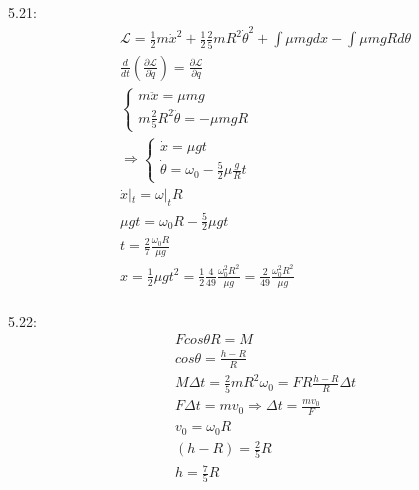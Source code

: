 \documentclass{article}
\begin{document}
5.21:
\begin{align*}
&\mathcal L=\frac12m\dot x^2+\frac12\frac25mR^2 \dot{\theta}^2 +\int \mu mgdx-\int \mu mgR d\theta \\
&\frac{d}{dt}(\frac{ \partial \mathcal L}{ \partial \dot{q}})=\frac{ \partial \mathcal L}{ \partial q} \\
&\begin{cases} 
  m\ddot{x}=\mu mg\\
  m\frac25R^2\ddot{\theta}=-\mu mgR
\end{cases}\\
&\Rightarrow\begin{cases} 
  \dot{x}=\mu g t\\
  \dot {\theta}=\omega_0-\frac52\mu \frac{g}Rt
\end{cases}\\
&\dot x|_t=\omega |_tR \\
&\mu gt=\omega_0R-\frac52\mu g t \\
&t=\frac27\frac{\omega_0R}{\mu g} \\
&x=\frac12 \mu g t^2=\frac12  \frac4{49} \frac{\omega_0^2R^2}{\mu g}=\frac2{49}\frac{\omega_0^2R^2}{\mu g} \\
\end{align*}

5.22:
\begin{align*}
&Fcos\theta R=M \\
&cos\theta =\frac{h-R}R \\
&M \Delta t=\frac25mR^2\omega_0=FR\frac{h-R}R\Delta t \\
&F\Delta t=mv_0\Rightarrow \Delta t=\frac{mv_0}F \\
&v_0=\omega_0R \\
&(h-R)=\frac25 R  \\
&h=\frac75R \\
\end{align*}
\end{document}
